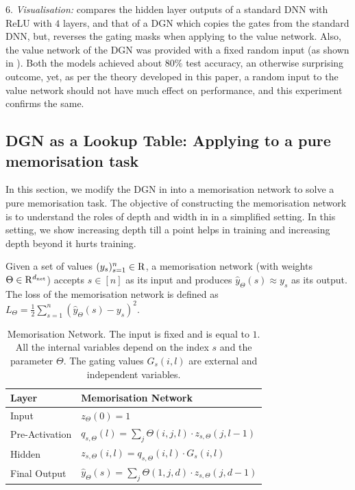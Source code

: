 \indent\quad $6.$ \emph{Visualisation:}  compares the hidden layer outputs of a standard DNN with ReLU with $4$ layers, and that of a DGN which copies the gates from the standard DNN, but, reverses the gating masks when applying to the value network. Also, the value network of the DGN was provided with a fixed random input (as shown in ). Both the models achieved about $80\%$ test accuracy, an otherwise surprising outcome, yet, as per the theory developed in this paper, a random input to the value network should not have much effect on performance, and this experiment confirms the same.


\subsection{DGN as a Lookup Table: Applying  to a pure memorisation task}\label{sec:mem}

In this section, we modify the DGN in  into a memorisation network to solve a pure memorisation task. The objective of constructing the memorisation network is to understand the roles of depth and width in  in a simplified setting. In this setting, we show increasing depth till a point helps in training and increasing depth beyond it hurts training. 

\begin{definition}
Given a set of values $(y_s)_{s=1}^n\in  \mathrm{R}$, a memorisation network (with weights $\Theta\in\mathrm{R}^{d_{\text{net}}}$) accepts $s\in[n]$ as its input and produces $\hat{y}_{\Theta}(s)\approx y_s$ as its output. The loss of the memorisation network is defined as $L_{\Theta}=\frac{1}{2}\sum_{s=1}^n (\hat{y}_{\Theta}(s)-y_s)^2$.
\end{definition}
\FloatBarrier
\begin{table}[h]
\centering
\begin{tabular}{| l |  l  |}\hline
Layer&  Memorisation Network\\\hline
Input  &$z_{\Theta}(0)=1$ \\
Pre-Activation & $q_{s,\Theta}(l)=\sum_{j}\Theta(i,j,l)\cdot z_{s,\Theta}(j,l-1)$\\
Hidden & $z_{s,\Theta}(i,l)=q_{s,\Theta}(i,l)\cdot G_{s}(i,l)$ \\
Final  Output & $\hat{y}_{\Theta}(s)=\sum_{j} \Theta(1,j,d) \cdot z_{s,\Theta}(j,d-1)$\\\hline
\end{tabular}
\caption{ Memorisation Network. The input is fixed and is equal to $1$. All the internal variables depend on the index $s$ and the parameter $\Theta$. The gating values $G_s(i,l)$ are external and independent variables.}
\label{tb:dgnmemo}
\end{table}

